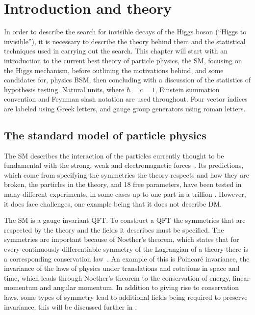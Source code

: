 \chapter{Introduction and theory}
\label{chap:theory}
In order to describe the search for invisible decays of the Higgs boson (``Higgs to invisible''), it is necessary to describe the theory behind them and the statistical techniques used in carrying out the search. This chapter will start with an introduction to the current best theory of particle physics, the \ac{SM}, focusing on the Higgs mechanism, before outlining the motivations behind, and some candidates for, physics \ac{BSM}, then concluding with a discussion of the statistics of hypothesis testing. Natural units, where $\hbar=c=1$, Einstein summation convention and Feynman slash notation are used throughout. Four vector indices are labeled using Greek letters, and gauge group generators using roman letters.


\section{The standard model of particle physics}
\label{sec:SM}
The SM describes the interaction of the particles currently thought to be fundamental with the strong, weak and electromagnetic forces~\cite{GlashowPartialSymmetries,WeinbergModelOfLeptons,SalamNobelSymposium,eightfoldway}. Its predictions, which come from specifying the symmetries the theory respects and how they are broken, the particles in the theory, and 18 free parameters, have been tested in many different experiments, in some cases up to one part in a trillion \cite{PhysRevLett.100.120801}. However, it does face challenges, one example being that it does not describe \ac{DM}. 

The SM is a gauge invariant \ac{QFT}. To construct a QFT the symmetries that are respected by the theory and the fields it describes must be specified. The symmetries are important because of Noether's theorem, which states that for every continuously differentiable symmetry of the Lagrangian of a theory there is a corresponding conservation law~\cite{Noether:1918zz,doi:10.1080/00411457108231446}. An example of this is Poincar\'e invariance, the invariance of the laws of physics under translations and rotations in space and time, which leads through Noether's theorem to the conservation of energy, linear momentum and angular momentum. In addition to giving rise to conservation laws, some types of symmetry lead to additional fields being required to preserve invariance, this will be discussed further in  \cite{PhysRev.96.191}.

